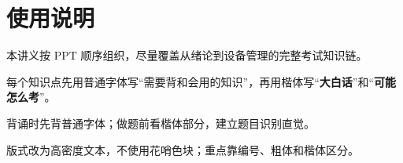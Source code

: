 \chapter*{使用说明}
\begin{points}
  \item 本讲义按 PPT 顺序组织，尽量覆盖从绪论到设备管理的完整考试知识链。
  \item 每个知识点先用普通字体写“需要背和会用的知识”，再用楷体写“\textbf{大白话}”和“\textbf{可能怎么考}”。
  \item 背诵时先背普通字体；做题前看楷体部分，建立题目识别直觉。
  \item 版式改为高密度文本，不使用花哨色块；重点靠编号、粗体和楷体区分。
\end{points}
